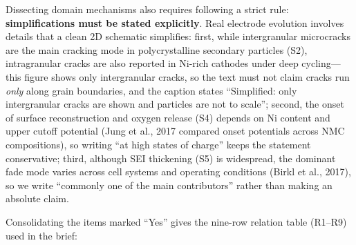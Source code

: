 Dissecting domain mechanisms also requires following a strict rule: \textbf{simplifications must be stated explicitly}. Real electrode evolution involves details that a clean 2D schematic simplifies: first, while intergranular microcracks are the main cracking mode in polycrystalline secondary particles (S2), intragranular cracks are also reported in Ni-rich cathodes under deep cycling---this figure shows only intergranular cracks, so the text must not claim cracks run \emph{only} along grain boundaries, and the caption states ``Simplified: only intergranular cracks are shown and particles are not to scale''; second, the onset of surface reconstruction and oxygen release (S4) depends on Ni content and upper cutoff potential (Jung et al., 2017 compared onset potentials across NMC compositions), so writing ``at high states of charge'' keeps the statement conservative; third, although SEI thickening (S5) is widespread, the dominant fade mode varies across cell systems and operating conditions (Birkl et al., 2017), so we write ``commonly one of the main contributors'' rather than making an absolute claim.

Consolidating the items marked ``Yes'' gives the nine-row relation table (R1--R9) used in the brief:

